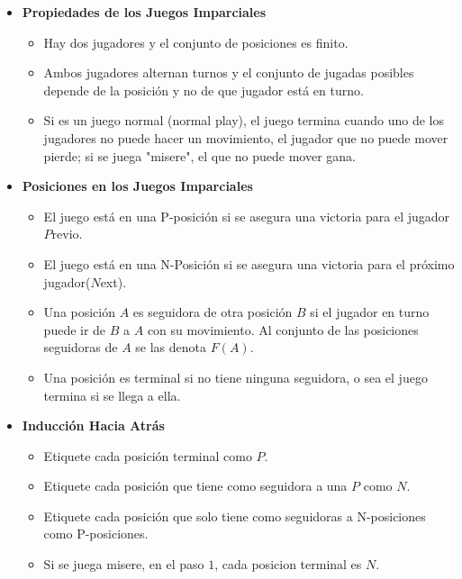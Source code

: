 \begin{itemize}
    \item{
		\textbf{Propiedades de los Juegos Imparciales}
		\begin{itemize}
			\item{
				Hay dos jugadores y el conjunto de posiciones es finito.
			}
			\item{
				Ambos jugadores alternan turnos y el conjunto de jugadas posibles depende de la posici\'on 
				y no de que jugador est\'a en turno.
			}
			\item{
				Si es un juego normal (normal play), el juego termina cuando uno de los jugadores no puede 
				hacer un movimiento, el jugador que no puede mover pierde; si se juega "misere", el que no 
				puede mover gana. 
			}
		\end{itemize}
    }
    
    \item{
		\textbf{Posiciones en los Juegos Imparciales}
		\begin{itemize}
			\item{
				El juego est\'a en una P-posici\'on si se asegura una victoria para el jugador $P$revio.
			}
			\item{
				El juego est\'a en una N-Posici\'on si se asegura una victoria para el pr\'oximo jugador($N$ext).
			}
			\item{
				Una posici\'on $A$ es seguidora de otra posici\'on $B$ si el jugador en turno puede ir de $B$ a $A$ 
				con su movimiento. Al conjunto de las posiciones seguidoras de $A$ se las denota $F(A)$.
			}
			\item{
				Una posici\'on es terminal si no tiene ninguna seguidora, o sea el juego termina si se llega a ella.	
			}
		\end{itemize}
    }
    
    \item{
		\textbf{Inducci\'on Hacia Atr\'as}
		\begin{itemize}
			\item{
				Etiquete cada posici\'on terminal como $P$.
			}
			\item{
				Etiquete cada posici\'on que tiene como seguidora a una $P$ como $N$.
			}
			\item{
				Etiquete cada posici\'on que solo tiene como seguidoras a N-posiciones como P-posiciones.
			}
			\item{
				Si se juega misere, en el paso $1$, cada posicion terminal es $N$.
			}
		\end{itemize}
    }
     

\end{itemize}
